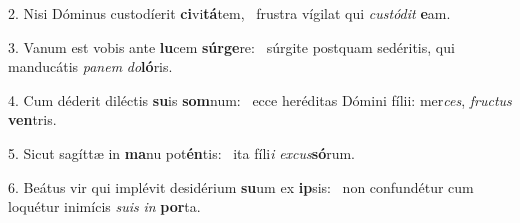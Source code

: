 2. Nisi Dóminus custodíerit \textbf{ci}vi\textbf{tá}tem, \ast\  frustra vígilat qui \textit{cus}\textit{tó}\textit{dit} \textbf{e}am.\

3. Vanum est vobis ante \textbf{lu}cem \textbf{súr}\textbf{ge}re: \ast\  súrgite postquam sedéritis, qui manducátis \textit{pa}\textit{nem} \textit{do}\textbf{ló}ris.\

4. Cum déderit diléctis \textbf{su}is \textbf{som}num: \ast\  ecce heréditas Dómini fílii: mer\textit{ces}, \textit{fruc}\textit{tus} \textbf{ven}tris.\

5. Sicut sagíttæ in \textbf{ma}nu pot\textbf{én}tis: \ast\  ita fíli\textit{i} \textit{ex}\textit{cus}\textbf{só}rum.\

6. Beátus vir qui implévit desidérium \textbf{su}um ex \textbf{ip}sis: \ast\  non confundétur cum loquétur inimícis \textit{su}\textit{is} \textit{in} \textbf{por}ta.\

